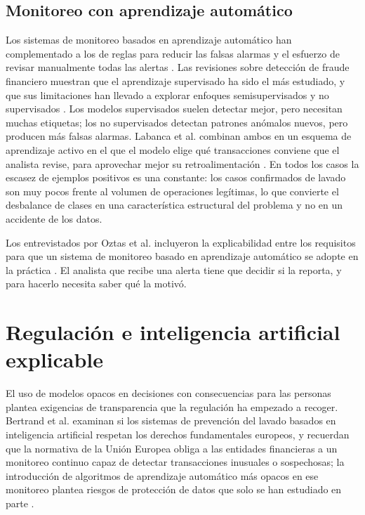 \subsection{Monitoreo con aprendizaje automático}

Los sistemas de monitoreo basados en aprendizaje automático han complementado a los de reglas para reducir las falsas alarmas y el esfuerzo de revisar manualmente todas las alertas \cite{Labanca2022Amaretto}. Las revisiones sobre detección de fraude financiero muestran que el aprendizaje supervisado ha sido el más estudiado, y que sus limitaciones han llevado a explorar enfoques semisupervisados y no supervisados \cite{Hilal2022Anomaly}. Los modelos supervisados suelen detectar mejor, pero necesitan muchas etiquetas; los no supervisados detectan patrones anómalos nuevos, pero producen más falsas alarmas. Labanca et al. combinan ambos en un esquema de aprendizaje
activo en el que el modelo elige qué transacciones conviene que el analista revise, para
aprovechar mejor su retroalimentación \cite{Labanca2022Amaretto}. En todos los casos la
escasez de ejemplos positivos es una constante: los casos confirmados de lavado son muy pocos
frente al volumen de operaciones legítimas, lo que convierte el desbalance de clases en una
característica estructural del problema y no en un accidente de los datos.

Los entrevistados por Oztas et al. incluyeron la explicabilidad entre los requisitos para que
un sistema de monitoreo basado en aprendizaje automático se adopte en la práctica
\cite{Oztas2024Monitoring}. El analista que recibe una alerta tiene que decidir si la reporta, y
para hacerlo necesita saber qué la motivó.

\section{Regulación e inteligencia artificial explicable}\label{sec:ctx_regulacion}

El uso de modelos opacos en decisiones con consecuencias para las personas plantea exigencias
de transparencia que la regulación ha empezado a recoger. Bertrand et al. examinan si los
sistemas de prevención del lavado basados en inteligencia artificial respetan los derechos
fundamentales europeos, y recuerdan que la normativa de la Unión Europea obliga a las entidades
financieras a un monitoreo continuo capaz de detectar transacciones inusuales o sospechosas; la
introducción de algoritmos de aprendizaje automático más opacos en ese monitoreo plantea riesgos
de protección de datos que solo se han estudiado en parte \cite{Bertrand2021Rights}.

